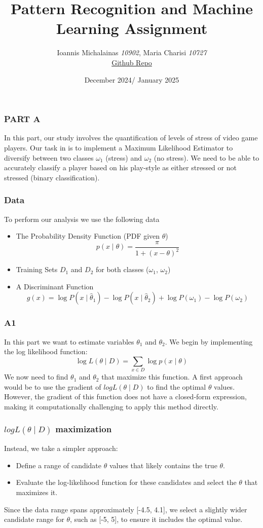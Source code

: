 \documentclass{beamer}
\title{Pattern Recognition and Machine Learning Assignment}
\author{Ioannis Michalainas \textit{10902}, Maria Charisi \textit{10727}\\
    \href{https://github.com/ioannisam/PR-ML}{Github Repo}
}
\date{December 2024/ January 2025}
\begin{document}
\frame{\titlepage}

\begin{frame}


\frametitle{PART A}
In this part, our study involves the quantification of levels of stress of video game players. Our task in is to implement a Maximum Likelihood Estimator to diversify between two classes $\omega_1$ (stress) and $\omega_2$ (no stress). We need to be able to accurately classify a player based on his play-style as either stressed or not stressed (binary classification).

\end{frame}

\begin{frame}
\frametitle{Data}

To perform our analysis we use the following data 
\begin{itemize}
    \item The Probability Density Function (PDF given $\theta$)$$ p(x \mid \theta) = \frac{\pi}{1 + (x - \theta)^2} $$
    \item Training Sets $D_1$ and $D_2$ for both classes ($\omega_1$, $\omega_2$)
    \item A Discriminant Function $$ g(x) = \log P(x \mid \hat{\theta}_1) - \log P(x \mid \hat{\theta}_2) + \log P(\omega_1) - \log P(\omega_2) $$
\end{itemize}
\end{frame}

\begin{frame}
\frametitle{A1}
In this part we want to estimate variables $\theta_1$ and $\theta_2$.
We begin by implementing the log likelihood function:
$$
\log L(\theta \mid D) = \sum_{x \in D} \log p(x \mid \theta)
$$
We now need to find $\theta_1$ and $\theta_2$ that maximize this function. A first approach would be to use the gradient of $log L(\theta \mid D)$ to find the optimal $\theta$ values. However, the gradient of this function does not have a closed-form expression, making it computationally challenging to apply this method directly.
\end{frame}

\begin{frame}
\frametitle{$log L(\theta \mid D)$ maximization}
Instead, we take a simpler approach:
\begin{itemize}
    \item Define a range of candidate $\theta$ values that likely contains the true $\theta$.
    \item Evaluate the log-likelihood function for these candidates and select the $\theta$ that maximizes it.
\end{itemize}
Since the data range spans approximately [-4.5, 4.1], we select a slightly wider candidate range for $\theta$, such as [-5, 5], to ensure it includes the optimal value.
\end{frame}
\end{document}
